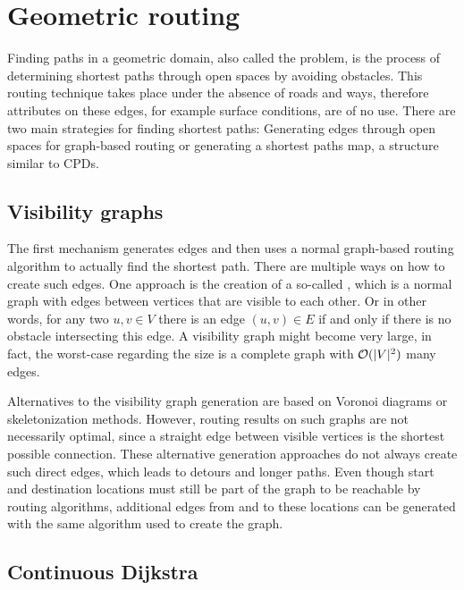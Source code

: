 \section{Geometric routing}
\label{sec:geometric-routing}

	Finding paths in a geometric domain, also called the  problem, is the process of determining shortest paths through open spaces by avoiding obstacles.
	This routing technique takes place under the absence of roads and ways, therefore attributes on these edges, for example surface conditions, are of no use.
	There are two main strategies for finding shortest paths:
	Generating edges through open spaces for graph-based routing or generating a shortest paths map, a structure similar to CPDs.
	
	\subsection{Visibility graphs}
	\label{subsec:visibility-graph}
	
		The first mechanism generates edges and then uses a normal graph-based routing algorithm to actually find the shortest path.
		There are multiple ways on how to create such edges.
		One approach is the creation of a so-called , which is a normal graph with edges between vertices that are visible to each other.
		Or in other words, for any two $u, v \in V$ there is an edge $(u, v) \in E$ if and only if there is no obstacle intersecting this edge.
		A visibility graph might become very large, in fact, the worst-case regarding the size is a complete graph with $\mathcal{O}(|V|^2)$ many edges.
		
		Alternatives to the visibility graph generation are based on Voronoi diagrams or skeletonization methods.
		However, routing results on such graphs are not necessarily optimal, since a straight edge between visible vertices is the shortest possible connection.
		These alternative generation approaches do not always create such direct edges\cite{graser-osm-open-spaces}, which leads to detours and longer paths.
		Even though start and destination locations must still be part of the graph to be reachable by routing algorithms, additional edges from and to these locations can be generated with the same algorithm used to create the graph.
	
	\subsection{Continuous Dijkstra}
	\label{subsec:continuous-dijkstra}
	
